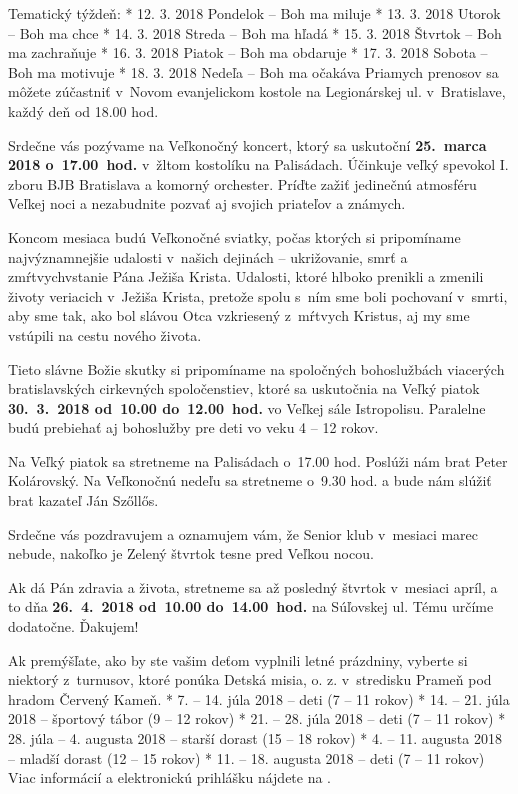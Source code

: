 Tematický týždeň:
\begitems
* 12. 3. 2018		Pondelok	–   Boh ma miluje
* 13. 3. 2018		Utorok	–   Boh ma chce
* 14. 3. 2018		Streda	–   Boh ma hľadá
* 15. 3. 2018		Štvrtok	–   Boh ma zachraňuje
* 16. 3. 2018		Piatok	–   Boh ma obdaruje
* 17. 3. 2018		Sobota	–   Boh ma motivuje
* 18. 3. 2018		Nedeľa	–   Boh ma očakáva
\enditems
Priamych prenosov sa môžete zúčastniť v~Novom evanjelickom kostole na Legionárskej ul. v~Bratislave, každý deň od 18.00 hod.


Srdečne vás pozývame na Veľkonočný koncert, ktorý sa uskutoční {\bf 25.~marca 2018 o~17.00~hod.} v~žltom kostolíku na Palisádach. Účinkuje veľký spevokol I. zboru BJB Bratislava a komorný orchester. Príďte zažiť jedinečnú atmosféru Veľkej noci a nezabudnite pozvať aj svojich priateľov a známych.


Koncom mesiaca budú Veľkonočné sviatky, počas ktorých si pripomíname najvýznamnejšie udalosti v~našich dejinách – ukrižovanie, smrť a zmŕtvychvstanie Pána Ježiša Krista. Udalosti, ktoré hlboko prenikli a zmenili životy veriacich v~Ježiša Krista, pretože spolu s~ním sme boli pochovaní v~smrti, aby sme tak, ako bol slávou Otca vzkriesený z~mŕtvych Kristus, aj my sme vstúpili na cestu nového života. 

Tieto slávne Božie skutky si pripomíname na spoločných bohoslužbách viacerých bratislavských cirkevných spoločenstiev, ktoré sa uskutočnia na Veľký piatok {\bf 30.~3.~2018 od~10.00 do~12.00~hod.} vo Veľkej sále Istropolisu. Paralelne budú prebiehať aj bohoslužby pre deti vo veku 4 -- 12 rokov.


Na Veľký piatok sa stretneme na Palisádach o~17.00 hod. Poslúži nám brat Peter Kolárovský. Na Veľkonočnú nedeľu sa stretneme o~9.30 hod. a bude nám slúžiť brat kazateľ Ján Szőllős.


Srdečne vás pozdravujem a oznamujem vám, že Senior klub v~mesiaci marec nebude, nakoľko je Zelený štvrtok tesne pred Veľkou nocou. 

Ak dá Pán zdravia a života, stretneme sa až posledný štvrtok v~mesiaci apríl, a to dňa {\bf 26.~4.~2018 od~10.00 do~14.00~hod.} na Súľovskej ul. Tému určíme dodatočne. Ďakujem!



Ak premýšľate, ako by ste vašim deťom vyplnili letné prázdniny, vyberte si niektorý z~turnusov, ktoré ponúka Detská misia, o. z. v~stredisku Prameň pod hradom Červený Kameň.
\begitems
* 7. -- 14. júla 2018 – deti (7 -- 11 rokov)
* 14. -- 21. júla 2018 – športový tábor (9 -- 12 rokov)
* 21. -- 28. júla 2018 – deti (7 -- 11 rokov)
* 28. júla -- 4. augusta 2018 – starší dorast (15 -- 18 rokov)
* 4. -- 11. augusta 2018 – mladší dorast (12 -- 15 rokov)
* 11. -- 18. augusta 2018 – deti (7 -- 11 rokov)
\enditems
Viac informácií a elektronickú prihlášku nájdete na .


